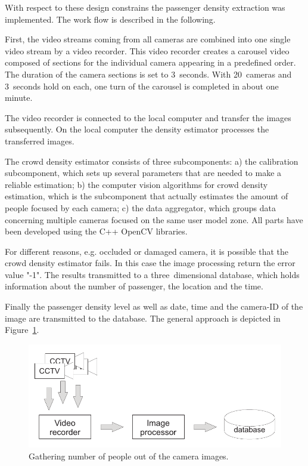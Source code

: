 With respect to these design constrains the passenger density extraction was implemented. The work flow is described in the following.

First, the video streams coming from all cameras are combined into one single video stream by a video recorder. This video recorder creates a carousel video composed of sections for the individual camera appearing in a predefined order. The duration of the camera sections is set to 3~seconds. With 20~cameras and 3~seconds hold on each, one turn of the carousel is completed in about one minute.

The video recorder is connected to the local computer and transfer the images subsequently. On the local computer the density estimator processes the transferred images.

The crowd density estimator consists of three subcomponents: a) the calibration subcomponent, which sets up several parameters that are needed to make a reliable estimation; b) the computer vision algorithms for crowd density estimation, which is the subcomponent that actually estimates the amount of people focused by each camera; c) the data aggregator, which groups data concerning multiple cameras focused on the same user model zone.
All parts have been developed using the C++ OpenCV libraries.

For different reasons, e.g. occluded or damaged camera, it is possible that the crowd density estimator fails. In this case the image processing return the error value "-1".
The results transmitted to a three~dimensional database, which holds information about the number of passenger, the location and the time.

Finally the passenger density level as well as date, time and the camera-ID of the image are transmitted to the database. The general approach is depicted in Figure~\ref{fig:CCTVimageProcessing}.

\begin{figure}[htb]
  \centering
  \includegraphics[width=\linewidth]{Figures/imageProcessing.pdf} 
  \caption{Gathering number of people out of the camera images.}
  \label{fig:CCTVimageProcessing}
\end{figure}

